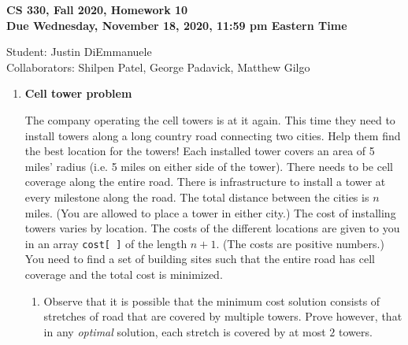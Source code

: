 \documentclass[11pt]{article}
\begin{document}
	
\begin{center}
\Large{\textbf{CS 330, Fall 2020, Homework 10 \\
Due Wednesday, November 18, 2020, 11:59 pm Eastern Time}}
\end{center}

\begin{center}
    \color{teal}
   Student: Justin DiEmmanuele \\
    Collaborators: Shilpen Patel, George Padavick, Matthew Gilgo
\end{center}



\begin{enumerate}
\item
{\bf Cell tower problem}

The company operating the cell towers is at it again. This time they need to install towers along a long country road connecting two cities.  Help them find the best location for the towers! Each installed tower covers an area of 5 miles' radius (i.e. 5 miles on either side of the tower). There needs to be cell coverage along the entire road.  There is infrastructure to install a tower at every milestone along the road. The total distance between the cities is $n$ miles. (You are allowed to place a tower in either city.)  The cost of installing towers varies by location. The costs of the different locations are given to you in an array \texttt{cost[\ ]} of the length $n+1$. (The costs are positive numbers.) You need to find  a set of building sites such that the entire road has cell coverage and the total cost is minimized. 



\begin{enumerate}
\item Observe that it is possible that the minimum cost solution consists of stretches of road that are covered by multiple towers. Prove however, that in any \emph{optimal} solution, each stretch is covered by at most $2$ towers.


\end{enumerate}
\end{enumerate}
\end{document}
